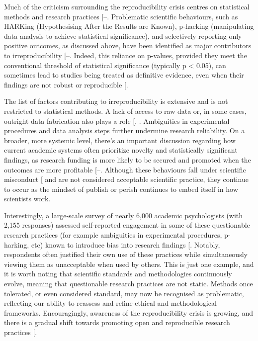 \documentclass[
  11pt,
  letterpaper,
]{scrreprt}
\begin{document}
Much of the criticism surrounding the reproducibility crisis centres on
statistical methods and research practices
{[}--\citeproc{ref-stefan2023Big}{340}{]}.
Problematic scientific behaviours, such as HARKing (Hypothesising After
the Results are Known), p-hacking (manipulating data analysis to achieve
statistical significance), and selectively reporting only positive
outcomes, as discussed above, have been identified as major contributors
to irreproducibility
{[}--\citeproc{ref-lew2020Reckless}{343}{]}.
Indeed, this reliance on p-values, provided they meet the conventional
threshold of statistical significance (typically p \textless{} 0.05),
can sometimes lead to studies being treated as definitive evidence, even
when their findings are not robust or reproducible
{[}\citeproc{ref-lew2020Reckless}{343}{]}.

The list of factors contributing to irreproducibility is extensive and
is not restricted to statistical methods. A lack of access to raw data
or, in some cases, outright data fabrication also plays a role
{[},
\citeproc{ref-bausell2021Problem}{345}{]}. Ambiguities in experimental
procedures and data analysis steps further undermine research
reliability. On a broader, more systemic level, there's an important
discussion regarding how current academic systems often prioritize
novelty and statistically significant findings, as research funding is
more likely to be secured and promoted when the outcomes are more
profitable
{[}--\citeproc{ref-ebadi2016How}{348}{]}.
Although these behaviours fall under scientific misconduct
{[}\citeproc{ref-science2023Reproducibility}{349}{]} and are not
considered acceptable scientific practice, they continue to occur as the
mindset of publish or perish continues to embed itself in how scientists
work.

Interestingly, a large-scale survey of nearly 6,000 academic
psychologists (with 2,155 responses) assessed self-reported engagement
in some of these questionable research practices (for example
ambiguities in experimental procedures, p-harking, etc) known to
introduce bias into research findings
{[}\citeproc{ref-john2012Measuring}{350}{]}. Notably, respondents often
justified their own use of these practices while simultaneously viewing
them as unacceptable when used by others. This is just one example, and
it is worth noting that scientific standards and methodologies
continuously evolve, meaning that questionable research practices are
not static. Methods once tolerated, or even considered standard, may now
be recognised as problematic, reflecting our ability to reassess and
refine ethical and methodological frameworks. Encouragingly, awareness
of the reproducibility crisis is growing, and there is a gradual shift
towards promoting open and reproducible research practices
{[}\citeproc{ref-nature2018Challenges}{352}{]}.
\end{document}
